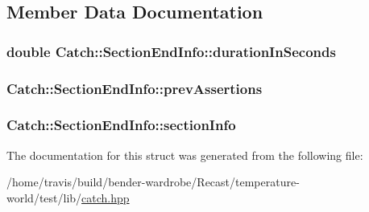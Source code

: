 \subsection{Member Data Documentation}
\hypertarget{struct_catch_1_1_section_end_info_a7c262f2dab9cff166b8eca620c47eea5}{
\subsubsection[{duration\-In\-Seconds}]{\setlength{\rightskip}{0pt plus 5cm}double Catch\-::\-Section\-End\-Info\-::duration\-In\-Seconds}}\label{struct_catch_1_1_section_end_info_a7c262f2dab9cff166b8eca620c47eea5}
\hypertarget{struct_catch_1_1_section_end_info_ae70b154cbc05b5dd2901d97f89303d8c}{
\subsubsection[{prev\-Assertions}]{ Catch\-::\-Section\-End\-Info\-::prev\-Assertions}}\label{struct_catch_1_1_section_end_info_ae70b154cbc05b5dd2901d97f89303d8c}
\hypertarget{struct_catch_1_1_section_end_info_a2d44793392cb83735d086d726822abe9}{
\subsubsection[{section\-Info}]{ Catch\-::\-Section\-End\-Info\-::section\-Info}}\label{struct_catch_1_1_section_end_info_a2d44793392cb83735d086d726822abe9}


The documentation for this struct was generated from the following file\-:\begin{DoxyCompactItemize}
\item 
/home/travis/build/bender-\/wardrobe/\-Recast/temperature-\/world/test/lib/\hyperlink{catch_8hpp}{catch.\-hpp}\end{DoxyCompactItemize}
